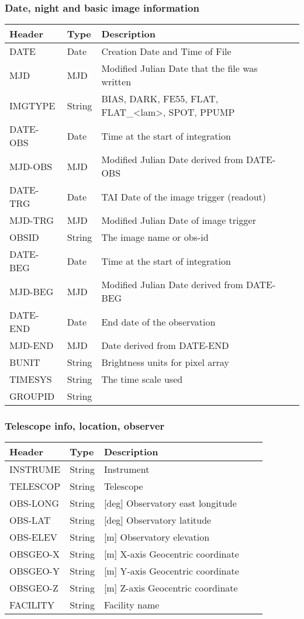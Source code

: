 
\subsubsection{Date, night and basic image information}


\begin{tabular}{l l l l l}
\hline
Header & Type & Description \\
\hline
DATE & Date & Creation Date and Time of File \\
MJD & MJD & Modified Julian Date that the file was written \\
IMGTYPE & String & BIAS, DARK, FE55, FLAT, FLAT\_<lam>, SPOT, PPUMP \\
DATE-OBS & Date & Time at the start of integration \\
MJD-OBS & MJD & Modified Julian Date derived from DATE-OBS \\
DATE-TRG & Date & TAI Date of the image trigger (readout) \\
MJD-TRG & MJD & Modified Julian Date of image trigger \\
OBSID & String & The image name or obs-id \\
DATE-BEG & Date & Time at the start of integration \\
MJD-BEG & MJD & Modified Julian Date derived from DATE-BEG \\
DATE-END & Date & End date of the observation \\
MJD-END & MJD & Date derived from DATE-END \\
BUNIT & String & Brightness units for pixel array \\
TIMESYS & String & The time scale used \\
GROUPID & String &  \\
\hline
\end{tabular}


\subsubsection{Telescope info, location, observer}


\begin{tabular}{l l l l l}
\hline
Header & Type & Description \\
\hline
INSTRUME & String & Instrument \\
TELESCOP & String & Telescope \\
OBS-LONG & String & [deg] Observatory east longitude \\
OBS-LAT & String & [deg] Observatory latitude \\
OBS-ELEV & String & [m] Observatory elevation \\
OBSGEO-X & String & [m] X-axis Geocentric coordinate \\
OBSGEO-Y & String & [m] Y-axis Geocentric coordinate \\
OBSGEO-Z & String & [m] Z-axis Geocentric coordinate \\
FACILITY & String & Facility name \\
\hline
\end{tabular}


